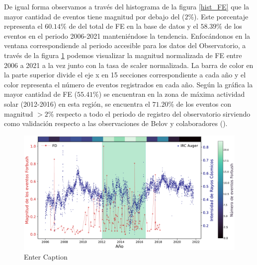 De igual forma observamos a través del histograma de la figura \ref{hist_FE} que la mayor cantidad de eventos tiene magnitud por debajo del ($2\%$). Este porcentaje representa el $60.14\%$ de del total de FE en la base de datos y el $58.39\%$ de los eventos en el periodo 2006-2021 manteniéndose la tendencia. Enfocándonos en la ventana correspondiende al periodo accesible para los datos del Observatorio, a través de la figura \ref{fig:FD_scaler} podemos visualizar la magnitud normalizada de FE entre 2006 a 2021 a la vez junto con la tasa de scaler normalizada. La barra de color en la parte superior divide el eje x en 15 secciones correspondiente a cada año  y el color representa el número de eventos registrados en cada año.
Según la gráfica la mayor cantidad de FE ($55.41\%$) se encuentran en la zona de máxima actividad solar (2012-2016) en esta región,  se encuentra el $71.20\%$ de los eventos con magnitud $>2\%$ respecto a todo el periodo de registro del observatorio sirviendo como validación respecto a las observaciones de Belov y colaboradores (\cite{belov_2009}).
\begin{figure}
    \includegraphics[width=1\linewidth]{Figs/Figr/FD_Scaler_AUGER.pdf}
    \caption{Enter Caption}
    \label{fig:FD_scaler}
\end{figure}
